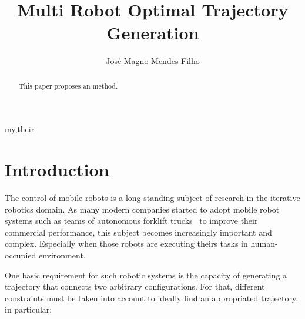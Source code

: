 \documentclass[eprint]{actapoly}
\begin{document}
\title[Trajectory Generation Approach]
{Multi Robot Optimal Trajectory Generation}

\author[J. M. Mendes Filho]{Jos\'{e} Magno Mendes Filho}{my,their}


\begin{abstract}
 This paper proposes an method.
\end{abstract}


\maketitle




\section{Introduction}\label{sec:intro}





The %
control of mobile robots is a long-standing subject of research 
in the iterative robotics domain. As many modern companies started to adopt 
mobile robot systems such as teams of autonomous forklift trucks~\cite{Gizmag} 
to improve their commercial performance, this subject becomes increasingly 
important and complex. Especially when those robots are executing theirs tasks 
in human-occupied environment.


One basic requirement for such robotic systems is the capacity of generating a 
trajectory that connects two arbitrary configurations. For that, different 
constraints must be taken into account to ideally find an appropriated 
trajectory, in particular:
\end{document}
